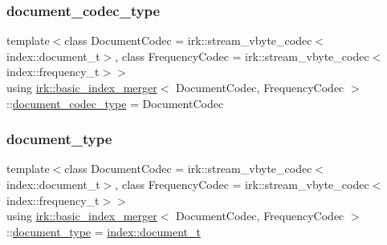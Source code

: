 \subsubsection{\texorpdfstring{document\+\_\+codec\+\_\+type}{document\_codec\_type}}
{\footnotesize\ttfamily template$<$class Document\+Codec  = irk\+::stream\+\_\+vbyte\+\_\+codec$<$index\+::document\+\_\+t$>$, class Frequency\+Codec  = irk\+::stream\+\_\+vbyte\+\_\+codec$<$index\+::frequency\+\_\+t$>$$>$ \\
using \mbox{\hyperlink{classirk_1_1basic__index__merger}{irk\+::basic\+\_\+index\+\_\+merger}}$<$ Document\+Codec, Frequency\+Codec $>$\+::\mbox{\hyperlink{classirk_1_1basic__index__merger_af331ba6d7dd6d96484c6608f4236d8f1}{document\+\_\+codec\+\_\+type}} =  Document\+Codec}

\mbox{\label{classirk_1_1basic__index__merger_a53640294a8d9edd9030e8900f5520716}} 
\subsubsection{\texorpdfstring{document\+\_\+type}{document\_type}}
{\footnotesize\ttfamily template$<$class Document\+Codec  = irk\+::stream\+\_\+vbyte\+\_\+codec$<$index\+::document\+\_\+t$>$, class Frequency\+Codec  = irk\+::stream\+\_\+vbyte\+\_\+codec$<$index\+::frequency\+\_\+t$>$$>$ \\
using \mbox{\hyperlink{classirk_1_1basic__index__merger}{irk\+::basic\+\_\+index\+\_\+merger}}$<$ Document\+Codec, Frequency\+Codec $>$\+::\mbox{\hyperlink{classirk_1_1basic__index__merger_a53640294a8d9edd9030e8900f5520716}{document\+\_\+type}} =  \mbox{\hyperlink{namespaceirk_1_1index_af829dedea20da89f9b51b49d78f57006}{index\+::document\+\_\+t}}}

\mbox{\label{classirk_1_1basic__index__merger_aafab06bb9812cd99b8cf1ed9ac575074}} 
